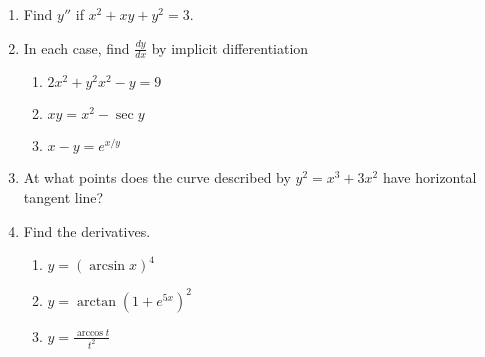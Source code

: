 \documentclass[11pt]{article}
\begin{document}
\begin{enumerate}

\item{Find $y''$ if $x^2+xy+y^2 = 3$}.

  \vspace{2in}

\item{In each case, find $\frac{dy}{dx}$ by implicit differentiation}

\begin{enumerate}
\item{$2x^2+y^2x^2-y = 9 $ }
  \vspace{2in}
\item{$xy= x^2 - \sec{y}$}
  \vspace{2in}
\item{$x-y=e^{x/y}$}
\end{enumerate}
  

  \vspace{2.5in}
\item{At what points does the curve described by $y^2=x^3+3x^2$ have horizontal tangent line? }



  \vspace{2.5in}


\item{Find the derivatives.}
\begin{enumerate}
\item{$y=(\arcsin{x})^4$ }
  \vspace{1.7in}
\item{$y=\arctan{(1+e^{5x})^2}$}
  \vspace{1.7in}
\item{$y = \frac{\arccos{t}}{t^2}$}
\end{enumerate}



\end{enumerate}
\end{document}
